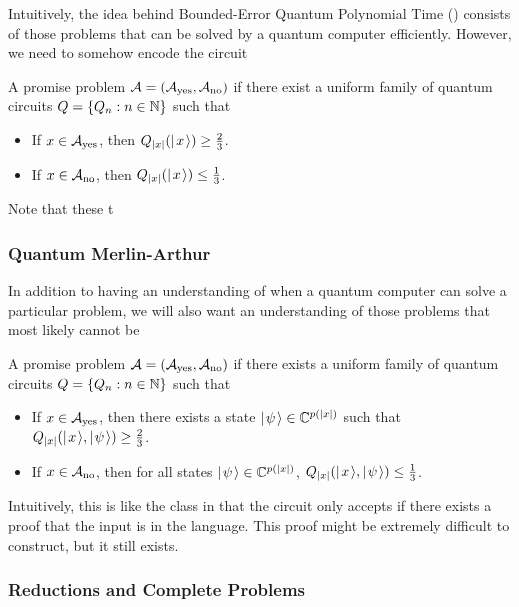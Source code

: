 \documentclass[../thesis-main/thesis-main]{subfiles}
\begin{document}
Intuitively, the idea behind Bounded-Error Quantum Polynomial Time (\BQP) consists of those problems that can be solved by a quantum computer efficiently.  However, we need to somehow encode the circuit 


\begin{definition}[\BQP] A promise problem $\mathcal{A} = (\mathcal{A}_{\text{yes}},\mathcal{A}_{\text{no}})$ if there exist a uniform family of quantum circuits $Q = \{Q_n: n\in \mathbb{N}\}$ such that 
  \begin{itemize}
    \item If $x\in \mathcal{A}_{\text{yes}}$, then $Q_{|x|}(|\mspace{2mu} x \mspace{2mu} \rangle) \geq \frac{2}{3}$.
    \item If $x\in \mathcal{A}_{\text{no}}$, then $Q_{|x|}(|\mspace{2mu} x \mspace{2mu} \rangle) \leq \frac{1}{3}$.
  \end{itemize}
\end{definition}

Note that these t

\subsubsection{Quantum Merlin-Arthur}

In addition to having an understanding of when a quantum computer can solve a particular problem, we will also want an understanding of those problems that most likely cannot be 


\begin{definition}[\QMA]  A promise problem $\mathcal{A} = (\mathcal{A}_{\text{yes}},\mathcal{A}_{\text{no}})$ if there exists a uniform family of quantum circuits $Q=\{Q_n:n\in \mathbb{N}\}$ such that
\begin{itemize}
  \item If $x\in \mathcal{A}_{\text{yes}}$, then there exists a state $|\mspace{2mu} \psi \mspace{2mu} \rangle\in \mathbb{C}^{p(|x|)}$ such that $Q_{|x|}(|\mspace{2mu} x \mspace{2mu} \rangle,|\mspace{2mu} \psi \mspace{2mu} \rangle) \geq \frac{2}{3}$.
  \item If $x\in \mathcal{A}_{\text{no}}$, then for all states $|\mspace{2mu} \psi \mspace{2mu} \rangle\in \mathbb{C}^{p(|x|)}$, $Q_{|x|}(|\mspace{2mu} x \mspace{2mu} \rangle,|\mspace{2mu} \psi \mspace{2mu} \rangle) \leq \frac{1}{3}$.
\end{itemize}
\end{definition}

Intuitively, this is like the class \NP in that the circuit only accepts if there exists a proof that the input is in the language.  This proof might be extremely difficult to construct, but it still exists.

\subsubsection{Reductions and Complete Problems}
\end{document}
